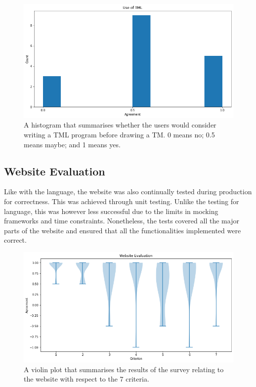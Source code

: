 \begin{figure}
    \centering
    \includegraphics[scale=0.35]{data/use-tml.png}
    \caption{A histogram that summarises whether the users would consider writing a TML program before drawing a TM. 0 means no; 0.5 means maybe; and 1 means yes.}
    \label{fig:use-tml}
\end{figure}

\subsection{Website Evaluation}
Like with the language, the website was also continually tested during production for correctness. This was achieved through unit testing. Unlike the testing for language, this was however less successful due to the limits in mocking frameworks and time constraints. Nonetheless, the tests covered all the major parts of the website and ensured that all the functionalities implemented were correct.

\begin{figure}
    \centering
    \includegraphics[scale=0.35]{data/website-evaluation.png}
    \caption{A violin plot that summarises the results of the survey relating to the website with respect to the 7 criteria.}
    \label{fig:website-evaluation}
\end{figure}

